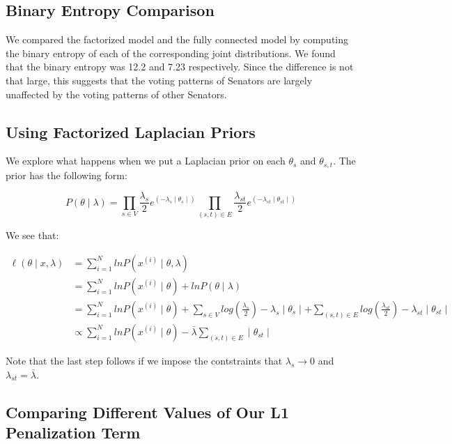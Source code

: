 \documentclass[]{article}
\begin{document}
\subsection{Binary Entropy Comparison}\label{binary-entropy-comparison}

We compared the factorized model and the fully connected model by
computing the binary entropy of each of the corresponding joint
distributions. We found that the binary entropy was 12.2 and 7.23
respectively. Since the difference is not that large, this suggests that
the voting patterns of Senators are largely unaffected by the voting
patterns of other Senators.

\subsection{Using Factorized Laplacian
Priors}\label{using-factorized-laplacian-priors}

We explore what happens when we put a Laplacian prior on each
\(\theta_s\) and \(\theta_{s,t}\). The prior has the following form:

\[P(\theta \mid \lambda) =  \prod_{s \in V}  \frac{\lambda_s}{2}e^{(-\lambda_s \mid \theta_s  \mid)} \prod_{(s,t) \in E} \frac{\lambda_{st}}{2}e^{(-\lambda_{st} \mid \theta_{st}  \mid)}\]

We see that:

\begin{align*}
\ell(\theta \mid x, \lambda) &= \sum_{i=1}^N ln P(x^{(i)} \mid \theta, \lambda) \\
&= \sum_{i=1}^N ln P(x^{(i)} \mid \theta) + ln P(\theta \mid \lambda) \\
&= \sum_{i=1}^N ln P(x^{(i)} \mid \theta) + \sum_{s \in V}  log \left( \frac{\lambda_s}{2} \right) -\lambda_s \mid \theta_s \mid + \sum_{(s,t) \in E} log \left( \frac{\lambda_{st}}{2} \right) -\lambda_{st} \mid \theta_{st}  \mid \\
&\propto \sum_{i=1}^N ln P(x^{(i)} \mid \theta) - \bar {\lambda } \sum_{(s,t) \in E} \mid \theta_{st}  \mid
\end{align*}

Note that the last step follows if we impose the contstraints that
\(\lambda_s \rightarrow 0\) and \(\lambda_{st} = \bar {\lambda }\).

\subsection{Comparing Different Values of Our L1 Penalization
Term}\label{comparing-different-values-of-our-l1-penalization-term}
\end{document}
